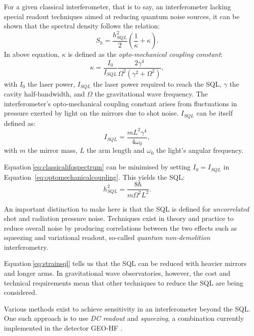 For a given classical interferometer, that is to say, an interferometer lacking special readout techniques aimed at reducing quantum noise sources, it can be shown \cite{Braginsky1996} that the spectral density follows the relation:
\begin{equation}
 S_h = \frac{h^{2}_{SQL}}{2} \left( \frac{1}{\kappa} + \kappa \right)
 \label{eq:classicalifospectrum}.
\end{equation}
In above equation, $\kappa$ is defined as the \emph{opto-mechanical coupling constant}:
\begin{equation}
 \kappa = \frac{I_0}{I_{SQL}} \frac{2 \gamma^4}{\Omega^2 \left( \gamma^2 +
\Omega^2 \right)},
 \label{eq:optomechanicalcoupling}
\end{equation}
with $I_0$ the laser power, $I_{SQL}$ the laser power required to reach the \gls{SQL}, $\gamma$ the cavity half-bandwidth, and $\Omega$ the gravitational wave frequency. The interferometer's opto-mechanical coupling constant arises from fluctuations in pressure exerted by light on the mirrors due to shot noise. $I_{SQL}$ can be itself defined as:
\begin{equation}
 I_{SQL} = \frac{m L^2 \gamma^4}{4 \omega_0},
\end{equation}
with $m$ the mirror mass, $L$ the arm length and $\omega_0$ the light's angular frequency.

Equation\,\ref{eq:classicalifospectrum} can be minimised by setting $I_0 = I_{SQL}$ in Equation~\ref{eq:optomechanicalcoupling}. This yields the \gls{SQL}:
\begin{equation}
 h^{2}_{SQL} = \frac{8 \hbar}{m \Omega^2 L^2}.
 \label{eq:strainsql}
\end{equation}

An important distinction to make here is that the \gls{SQL} is defined for \emph{uncorrelated} shot and radiation pressure noise. Techniques exist in theory and practice to reduce overall noise by producing correlations between the two effects such as squeezing and variational readout, so-called \emph{quantum non-demolition} interferometry.

Equation\,\ref{eq:strainsql} tells us that the \gls{SQL} can be reduced with heavier mirrors and longer arms. In gravitational wave observatories, however, the cost and technical requirements mean that other techniques to reduce the \gls{SQL} are being considered.

Various methods exist to achieve sensitivity in an interferometer beyond the \gls{SQL}. One such approach is to use \emph{DC readout} and \emph{squeezing}, a combination currently implemented in the detector GEO-HF \cite{Willke2006, Affeldt2014}.


